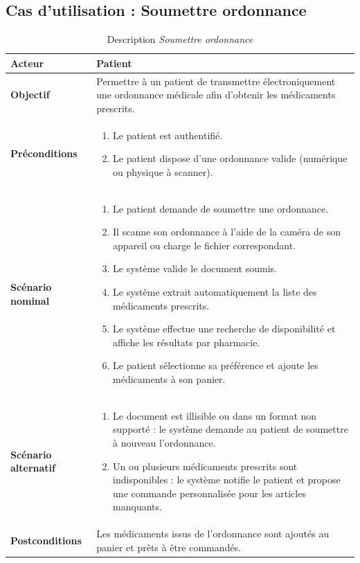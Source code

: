 \documentclass[12pt,a4paper]{report}
\begin{document}
\subsection*{Cas d'utilisation : Soumettre ordonnance}

\begin{table}[H]
    \centering
    \begin{tabular}{|p{4cm}|p{9cm}|}
        \hline
        \textbf{Acteur} & Patient \\
        \hline
        \textbf{Objectif} & Permettre à un patient de transmettre électroniquement une ordonnance médicale afin d'obtenir les médicaments prescrits. \\
        \hline
        \textbf{Préconditions} &
        \begin{enumerate}
            \item Le patient est authentifié.
            \item Le patient dispose d'une ordonnance valide (numérique ou physique à scanner).
        \end{enumerate} \\
        \hline
        \textbf{Scénario nominal} &
        \begin{enumerate}
            \item Le patient demande de soumettre une ordonnance.
            \item Il scanne son ordonnance à l'aide de la caméra de son appareil ou charge le fichier correspondant.
            \item Le système valide le document soumis.
            \item Le système extrait automatiquement la liste des médicaments prescrits.
            \item Le système effectue une recherche de disponibilité et affiche les résultats par pharmacie.
            \item Le patient sélectionne sa préférence et ajoute les médicaments à son panier.
        \end{enumerate} \\
        \hline
        \textbf{Scénario alternatif} &
        \begin{enumerate}
            \item[3.a] Le document est illisible ou dans un format non supporté : le système demande au patient de soumettre à nouveau l'ordonnance.
            \item[5.a] Un ou plusieurs médicaments prescrits sont indisponibles : le système notifie le patient et propose une commande personnalisée pour les articles manquants.
        \end{enumerate} \\
        \hline
        \textbf{Postconditions} & Les médicaments issus de l'ordonnance sont ajoutés au panier et prêts à être commandés. \\
        \hline
    \end{tabular}
    \caption{Description \textit{Soumettre ordonnance}}
\end{table}
\end{document}
